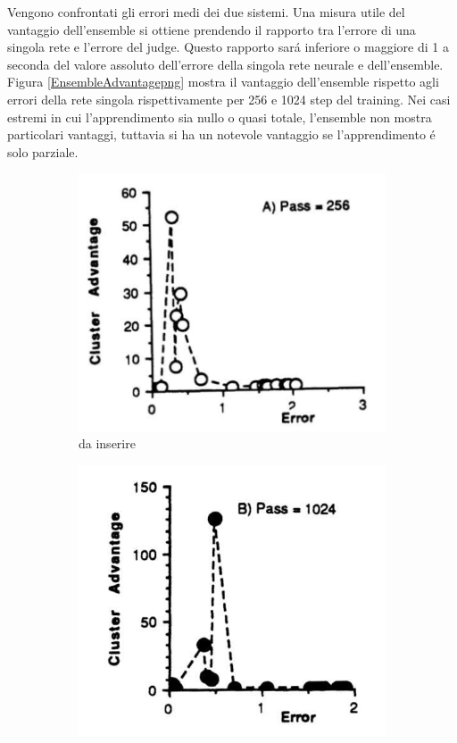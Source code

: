 \documentclass[a4paper,10pt]{article}
\begin{document}
 
 Vengono confrontati gli errori medi dei due sistemi. Una misura utile del vantaggio dell'ensemble si ottiene prendendo il rapporto tra l'errore di una singola rete e l'errore del judge. Questo rapporto sar\'a inferiore o maggiore di 1 a seconda del valore assoluto dell'errore della singola rete neurale e dell'ensemble. Figura \ref{EnsembleAdvantagepng} mostra il vantaggio dell'ensemble rispetto agli errori della rete singola rispettivamente per 256 e 1024 step del training. Nei casi estremi in cui l'apprendimento sia nullo o quasi totale, l'ensemble non mostra particolari vantaggi, tuttavia si ha un notevole vantaggio se l'apprendimento \'e solo parziale.
 
 \begin{figure}[h!]
  \centering
  \begin{subfigure}[b]{0.4\linewidth}
   \includegraphics[width=\linewidth]{ClusterErrora.png}
   \caption{da inserire}
   \label{ClusterErrorapgn}
  \end{subfigure}
  \begin{subfigure}[b]{0.4\linewidth}
   \includegraphics[width=\linewidth]{ClusterErrorb.png}

\end{subfigure}
\end{figure}
\end{document}
